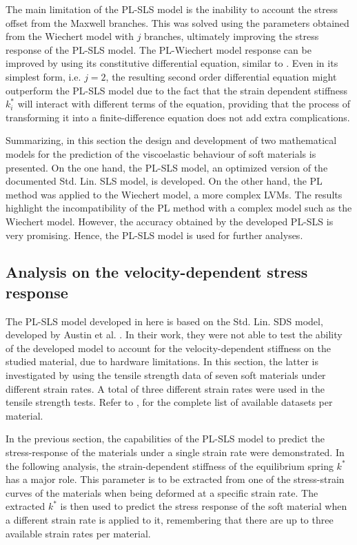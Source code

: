 The main limitation of the PL-SLS model is the inability to account the stress offset from the Maxwell branches. This was solved using the parameters obtained from the Wiechert model with $j$ branches, ultimately improving the stress response of the PL-SLS model. The PL-Wiechert model response can be improved by using its constitutive differential equation, similar to . Even in its simplest form, i.e. $j=2$, the resulting second order differential equation might outperform the PL-SLS model due to the fact that the strain dependent stiffness $k_i^*$ will interact with different terms of the equation, providing that the process of transforming it into a finite-difference equation does not add extra complications.

Summarizing, in this section the design and development of two mathematical models for the prediction of the viscoelastic behaviour of soft materials is presented. On the one hand, the PL-SLS model, an optimized version of the documented Std. Lin. SLS model, is developed. On the other hand, the PL method was applied to the Wiechert model, a more complex LVMs. The results highlight the incompatibility of the PL method with a complex model such as the Wiechert model. However, the accuracy obtained by the developed PL-SLS is very promising. Hence, the PL-SLS model is used for further analyses.

\newpage
\subsection{Analysis on the velocity-dependent stress response} \label{VelocityAnalysis}

The PL-SLS model developed in here is based on the Std. Lin. SDS model, developed by Austin et al. \cite{austin2015control}. In their work, they were not able to test the ability of the developed model to account for the velocity-dependent stiffness on the studied material, due to hardware limitations. In this section, the latter is investigated by using the tensile strength data of seven soft materials under different strain rates. A total of three different strain rates were used in the tensile strength tests. Refer to , for the complete list of available datasets per material.

In the previous section, the capabilities of the PL-SLS model to predict the stress-response of the materials under a single strain rate were demonstrated. In the following analysis, the strain-dependent stiffness of the equilibrium spring $k^*$ has a major role. This parameter is to be extracted from one of the stress-strain curves of the materials when being deformed at a specific strain rate. The extracted $k^*$ is then used to predict the stress response of the soft material when a different strain rate is applied to it, remembering that there are up to three available strain rates per material. 

